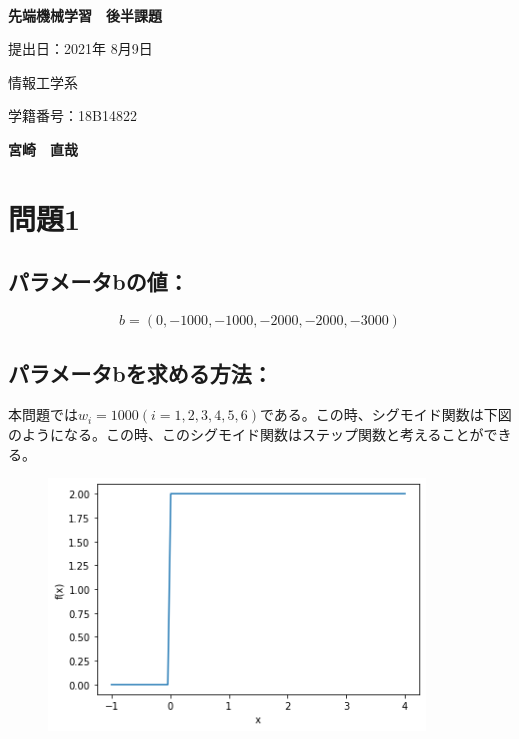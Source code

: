 \documentclass[a4j,11pt]{jarticle}
\begin{document}
\begin{center}
　\vspace{10mm}

{\bf {\huge 先端機械学習　後半課題}}

\vspace{80mm}

提出日：2021年 8月9日

\vspace{10mm}

情報工学系

\vspace{10mm}

学籍番号：18B14822

\vspace{10mm}


\vspace{20mm}

{\bf {\LARGE 宮崎　直哉}}
\end{center}





\newpage




\section{問題1}

\subsection*{パラメータbの値：}

\begin{equation*}
    b = (0, -1000, -1000, -2000, -2000, -3000)
\end{equation*}

\subsection*{パラメータbを求める方法：}
本問題では$w_i = 1000 (i = 1,2,3,4,5,6)$である。この時、シグモイド関数は下図のようになる。この時、このシグモイド関数はステップ関数と考えることができる。

\begin{figure}[hbtp]
    \centering
    \includegraphics[width=10cm]{p1-3.png}
\end{figure}
\end{document}
